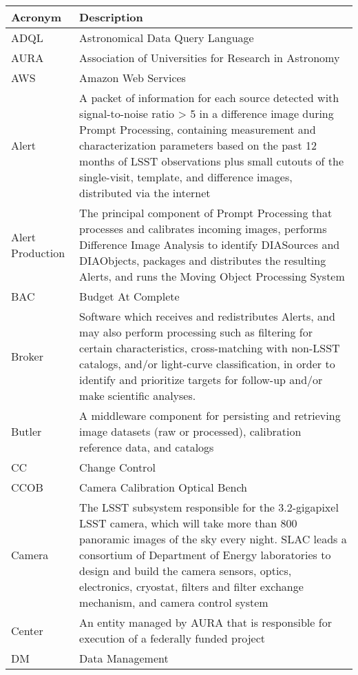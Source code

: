 \addtocounter{table}{-1}
\begin{longtable}{|p{}|p{}|}\hline
\textbf{Acronym} & \textbf{Description}  \\\hline

ADQL & Astronomical Data Query Language \\\hline
AURA & Association of Universities for Research in Astronomy \\\hline
AWS & Amazon Web Services \\\hline
Alert & A packet of information for each source detected with signal-to-noise ratio > 5 in a difference image during Prompt Processing, containing measurement and characterization parameters based on the past 12 months of LSST observations plus small cutouts of the single-visit, template, and difference images, distributed via the internet \\\hline
Alert Production & The principal component of Prompt Processing that processes and calibrates incoming images, performs Difference Image Analysis to identify DIASources and DIAObjects, packages and distributes the resulting Alerts, and runs the Moving Object Processing System \\\hline
BAC & Budget At Complete \\\hline
Broker & Software which receives and redistributes Alerts, and may also perform processing such as filtering for certain characteristics, cross-matching with non-LSST catalogs, and/or light-curve classification, in order to identify and prioritize targets for follow-up and/or make scientific analyses.  \\\hline
Butler & A middleware component for persisting and retrieving image datasets (raw or processed), calibration reference data, and catalogs \\\hline
CC & Change Control \\\hline
CCOB & Camera Calibration Optical Bench \\\hline
Camera & The LSST subsystem responsible for the 3.2-gigapixel LSST camera, which will take more than 800 panoramic images of the sky every night. SLAC leads a consortium of Department of Energy laboratories to design and build the camera sensors, optics, electronics, cryostat, filters and filter exchange mechanism, and camera control system \\\hline
Center & An entity managed by AURA that is responsible for execution of a federally funded project \\\hline
DM & Data Management \\\hline

\end{longtable}
